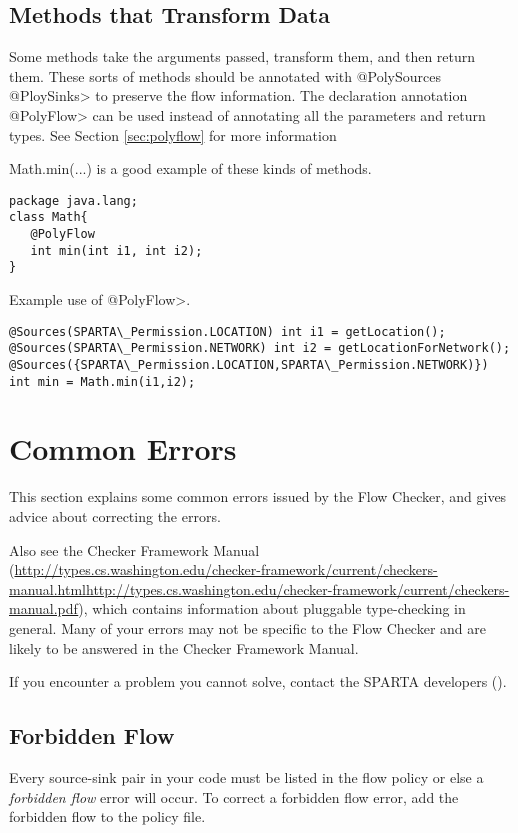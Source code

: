 \subsection{Methods that Transform Data}

Some methods take the arguments passed, transform them, and then return them.  These sorts of 
methods should be annotated with \<@PolySources @PloySinks>
  to preserve the flow information.  The declaration annotation \<@PolyFlow> can be used instead of
  annotating all the parameters and return types. See Section \ref{sec:polyflow} for more information 
  
  Math.min(...) is a good example of these kinds of methods. 
  
  \begin{Verbatim}
package java.lang;
class Math{
   @PolyFlow  
   int min(int i1, int i2);
}
\end{Verbatim}

Example use of \<@PolyFlow>.
\begin{Verbatim}
@Sources(SPARTA\_Permission.LOCATION) int i1 = getLocation();
@Sources(SPARTA\_Permission.NETWORK) int i2 = getLocationForNetwork();
@Sources({SPARTA\_Permission.LOCATION,SPARTA\_Permission.NETWORK)}) int min = Math.min(i1,i2);
 \end{Verbatim}

\section{Common Errors\label{errors}}

This section explains some common errors issued by the Flow Checker, and
gives advice about correcting the errors.   

Also see the Checker Framework Manual
(\ifhevea\url{http://types.cs.washington.edu/checker-framework/current/checkers-manual.html}\else\url{http://types.cs.washington.edu/checker-framework/current/checkers-manual.pdf}\fi),
which contains information about pluggable type-checking in general.  Many
of your errors may not be specific to the Flow Checker and are likely to be
answered in the Checker Framework Manual.

If you encounter a problem you cannot solve, contact the SPARTA developers ().



\subsection{Forbidden Flow}  
Every source-sink pair in your code must be listed in the flow policy or else a \emph{forbidden flow} error will occur.
To correct a forbidden flow error, add the forbidden flow to the policy file. 
  
